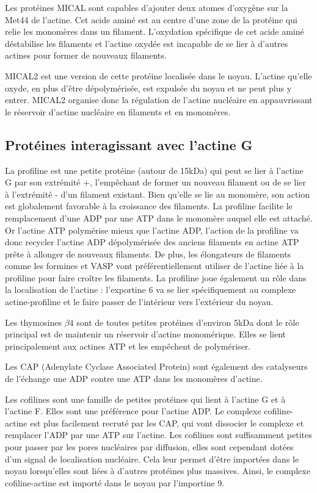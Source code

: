 Les protéines MICAL sont capables d'ajouter deux atomes d'oxygène sur la Met44 de l'actine. Cet acide aminé est au centre d'une zone de la protéine qui relie les monomères dans un filament. 
L'oxydation spécifique de cet acide aminé déstabilise les filaments et l'actine oxydée est incapable de se lier à d'autres actines pour former de nouveaux filaments. 

MICAL2 est une version de cette protéine localisée dans le noyau. L'actine qu'elle oxyde, en plus d'être dépolymérisée, est expulsée du noyau et ne peut plus y entrer. MICAL2 organise donc la régulation de l'actine nucléaire en appauvrissant le réservoir d'actine nucléaire en filaments et en monomères.

\subsection{Protéines interagissant avec l'actine G}

 La profiline est une petite protéine (autour de 15kDa) qui peut se lier à l'actine G par son extrémité +, l'empêchant de former un nouveau filament ou de se lier à l'extrémité - d'un filament existant. 
Bien qu'elle se lie au monomère, son action est globalement favorable à la croissance des filaments. 
La profiline facilite le remplacement d'une ADP par une ATP dans le monomère auquel elle est attaché. 
Or l'actine ATP polymérise mieux que l'actine ADP, l'action de la profiline va donc recycler l'actine ADP dépolymérisée des anciens filaments en actine ATP prête à allonger de nouveaux filaments. 
De plus, les élongateurs de filaments comme les formines et VASP vont préférentiellement utiliser de l'actine liée à la profiline pour faire croître les filaments. 
La profiline joue également un rôle dans la localisation de l'actine : l'exportine 6 va se lier spécifiquement au complexe actine-profiline et le faire passer de l'intérieur vers l'extérieur du noyau. 


Les thymosines $\beta 4$ sont de toutes petites protéines d'environ 5kDa dont le rôle principal est de maintenir un réservoir d'actine monomérique. Elles se lient principalement aux actines ATP et les empêchent de polymériser. 

Les CAP (Adenylate Cyclase Associated Protein) sont également des catalyseurs de l'échange une ADP contre une ATP dans les monomères d'actine. 

Les cofilines sont une famille de petites protéines qui lient à l'actine G et à l'actine F. Elles sont une préférence pour l'actine ADP. 
Le complexe cofiline-actine est plus facilement recruté par les CAP, qui vont  dissocier le complexe et remplacer l'ADP par une ATP sur l'actine. 
Les cofilines sont suffisamment petites pour passer par les pores nucléaires par diffusion, elles sont cependant dotées d'un signal de localisation nucléaire. Cela leur permet d'être importées dans le noyau lorsqu'elles sont liées à d'autres protéines plus massives. 
Ainsi, le complexe cofiline-actine est importé dans le noyau par l'importine 9. 

